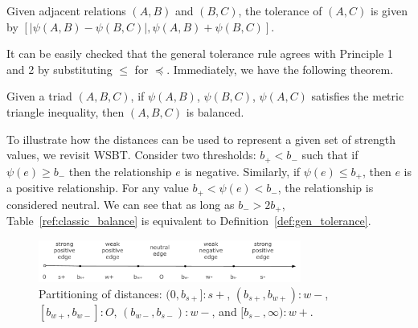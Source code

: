 


\begin{definition} \label{def:gen_tolerance}
Given adjacent relations $(A,B)$ and $(B,C)$, the tolerance of $(A,C)$
is given by $[|\psi(A,B)-\psi(B,C)|, \psi(A,B)+\psi(B,C)]$.
\end{definition}

It can be easily checked that the general tolerance rule agrees with
Principle 1 and 2 by substituting $\leq$ for $\preceq$.  Immediately, we have the following
theorem.
\begin{theorem} 
Given a triad $(A,B,C)$, if $\psi(A,B)$, $\psi(B,C)$, $\psi(A,C)$
satisfies the metric triangle inequality, then $(A,B,C)$ is balanced.
\end{theorem}

To illustrate how the distances can be used to represent a given set
of strength values, we revisit WSBT. Consider two thresholds:
$b_{+} < b_{-}$ such that if $\psi(e)\geq b_{-}$ then the relationship
$e$ is negative. Similarly, if $\psi(e)\leq b_{+}$, then $e$ is
a positive relationship. For any value $b_{+} < \psi(e) < b_{-}$, the
relationship is considered neutral. We can see that as long as
$b_{-}>2b_{+}$, Table~\ref{ref:classic_balance} is equivalent to
Definition~\ref{def:gen_tolerance}.

\begin{figure}[th]
\centering
\includegraphics[height=0.55in]{Figs/mapping2.pdf}
\vspace*{-0.1in}
\caption{\label{fig:partition} Partitioning of distances:
  $(0,b_{s+}]:s+$, $(b_{s+}, b_{w+}): w-$, $[b_{w+}, b_{w-}]:O$,
$(b_{w-}, b_{s-}):w-$, and $ [b_{s-}, \infty):w+$.}

\end{figure}

